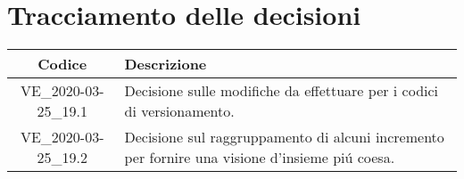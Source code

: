 \section*{Tracciamento delle decisioni}

\begin{center}
	\begin{longtable}{|c|p{12.25cm}|}
	\hline
	\rowcolor{lighter-grayer}
	\textbf{Codice} & \textbf{Descrizione} \\
	\hline
	\endfirsthead

	\hline
	VE\_2020-03-25\_19.1 & Decisione sulle modifiche da effettuare per i codici di versionamento. \\
	\hline
	VE\_2020-03-25\_19.2 & Decisione sul raggruppamento di alcuni incremento per fornire una visione d'insieme piú coesa. \\
	\hline

	\end{longtable}
\end{center}
